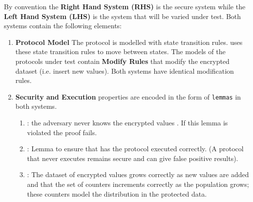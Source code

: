 \documentclass[journal]{IEEEtran}
\begin{document}
 By convention the \textbf{Right Hand System (RHS)} is the secure system while the \textbf{Left Hand System (LHS)} is the system that will be varied under test. Both systems contain the following elements:
\begin{enumerate}[label=(\Alph*)]
\item \textbf{Protocol Model} The protocol is modelled with \tamarin{} state transition rules. \tamarin{} uses these state transition rules to move between states. The models of the protocols under test contain \textbf{Modify Rules} that modify the encrypted dataset (i.e. insert new values). Both systems have identical modification rules.
\item \textbf{Security and Execution} properties are encoded in the form of \texttt{lemmas} in both systems. 
\begin{enumerate}
	\item {}: the adversary never knows the encrypted values \enc{}. If this lemma is violated the proof fails.
    \item {}: Lemma to ensure that has the protocol executed correctly. (A protocol that never executes remains secure and can give false positive results).
	\item {}: The dataset of encrypted values \enc{} grows correctly as new values are added and that the set of counters increments correctly as the population grows; these counters model the distribution in the protected data.
\end{enumerate}


\end{enumerate}
\end{document}
